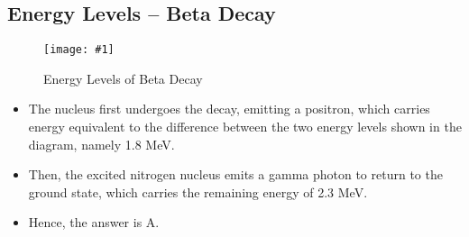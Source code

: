 \documentclass[a4paper,12pt]{article}
\newcommand{\img}[4]{\begin{center}
  \begin{figure}[H]
    \centering
    \texttt{[image: \#1]}
    \caption{#3}
    \label{fig:#4}
  \end{figure}
\end{center}}
\begin{document}
\pagebreak

\subsection{Energy Levels -- Beta Decay}

\img{ex/2.png}{0.7}{Energy Levels of Beta Decay}{ex2}

\begin{itemize}
  \item The nucleus first undergoes the decay, emitting a positron, which carries energy equivalent to the difference between the two energy levels shown in the diagram, namely 1.8 MeV.
  \item Then, the excited nitrogen nucleus emits a gamma photon to return to the ground state, which carries the remaining energy of 2.3 MeV.
  \item Hence, the answer is A.
\end{itemize}
\end{document}
